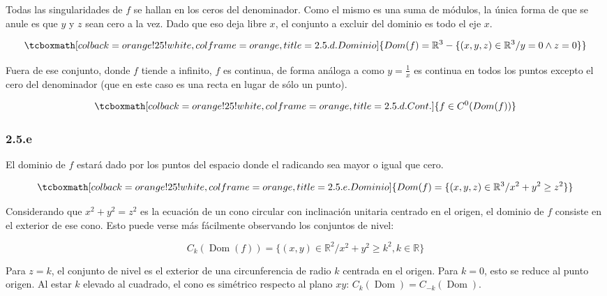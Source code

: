 \documentclass{article}
\renewcommand{\Bbb}{\mathbb}
\begin{document}
Todas las singularidades de $f$ se hallan en los ceros del denominador. Como el mismo es una suma de módulos, la única forma de que se anule es que $y$ y $z$ sean cero a la vez. Dado que eso deja libre $x$, el conjunto a excluir del dominio es todo el eje $x$.

\begin{equation}
\tcboxmath[colback=orange!25!white,colframe=orange,title=2.5.d. Dominio ]
{ \mathop{Dom}(f) = \Bbb R^3 - \{ (x,y,z) \in \Bbb R^3 / y = 0 \wedge z = 0 \} }
\end{equation}

Fuera de ese conjunto, donde $f$ tiende a infinito, $f$ es continua, de forma análoga a como $y = \frac{1}{x}$ es continua en todos los puntos excepto el cero del denominador (que en este caso es una recta en lugar de sólo un punto).

\begin{equation}
\tcboxmath[colback=orange!25!white,colframe=orange,title=2.5.d. Cont. ]
{ f \in C^0(\mathop{Dom(f)}) }
\end{equation}

\subsubsection*{2.5.e}
\label{subsubsec:2.5.e}

El dominio de $f$ estará dado por los puntos del espacio donde el radicando sea mayor o igual que cero.

\begin{equation}
\tcboxmath[colback=orange!25!white,colframe=orange,title=2.5.e. Dominio ]
{ \mathop{Dom}(f) = \{ (x,y,z) \in \Bbb R^3 / x^2 + y^2 \geq z^2 \} }
\end{equation}

Considerando que $x^2 + y^2 = z^2$ es la ecuación de un cono circular con inclinación unitaria centrado en el origen, el dominio de $f$ consiste en el exterior de ese cono. Esto puede verse más fácilmente observando los conjuntos de nivel:

\begin{equation}
C_k(\mathop{Dom}(f)) = \{ (x,y) \in \Bbb R^2 / x^2 + y^2 \geq k^2, k \in \Bbb R \}
\end{equation}

Para $z = k$, el conjunto de nivel es el exterior de una circunferencia de radio $k$ centrada en el origen. Para $k = 0$, esto se reduce al punto origen. Al estar $k$ elevado al cuadrado, el cono es simétrico respecto al plano $xy$: $C_k(\mathop{Dom(f)}) = C_{-k}(\mathop{Dom(f)})$.
\end{document}
